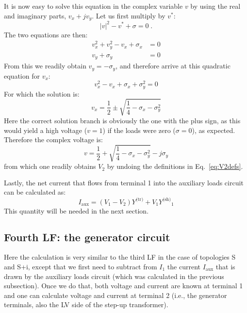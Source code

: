 \documentclass[a4paper,11pt]{article}
\providecommand{\abs}[1]{\lvert#1\rvert}
\newcommand{\Ytr}{\ensuremath{Y^{\textrm{(tr)}}}}
\newcommand{\Ysh}{\ensuremath{Y^{\textrm{(sh)}}}}
\begin{document}
It is now easy to solve this equation in the complex variable $v$ by using the
real and imaginary parts, $v_x + j v_y$. Let us first multiply by $v^*$:
\begin{equation*}
  \abs{v}^2 - v^* + \sigma = 0 \;.
\end{equation*}
The two equations are then:
\begin{align*}
  v_x^2 + v_y^2 - v_x + \sigma_x  & = 0 \\
  v_y + \sigma_y  & = 0
\end{align*}
From this we readily obtain $v_y = -\sigma_y$, and therefore arrive at this
quadratic equation for $v_x$:
\begin{equation*}
  v_x^2 - v_x + \sigma_x  + \sigma_y^2 = 0
\end{equation*}
For which the solution is:
\begin{equation*}
  v_x = \frac{1}{2} \pm \sqrt{\frac{1}{4} - \sigma_x - \sigma_y^2}
\end{equation*}
Here the correct solution branch is obviously the one with the plus sign, as this would
yield a high voltage ($v=1$) if the loads were zero ($\sigma=0$), as expected. Therefore
the complex voltage is:
\begin{equation}
  v = \frac{1}{2} + \sqrt{\frac{1}{4} - \sigma_x - \sigma_y^2} - j \sigma_y
\end{equation}
from which one readily obtains $V_2$ by undoing the definitions in
Eq.~\eqref{eq:V2defs}.

Lastly, the net current that flows from terminal 1 into the auxiliary loads
circuit can be calculated as:
\begin{equation}
  I_{\text{aux}} = (V_1 - V_2) \Ytr + V_1 \Ysh_1
\end{equation}
This quantity will be needed in the next section.



\subsection{Fourth LF: the generator circuit}

Here the calculation is very similar to the third LF in the case of topologies S and
S+i, except that we first need to subtract from $I_1$ the current $I_{\text{aux}}$ that
is drawn by the auxiliary loads circuit (which was calculated in the previous
subsection).  Once we do that, both voltage and current are known at terminal 1 and one
can calculate voltage and current at terminal 2 (i.e., the generator terminals, also the
LV side of the step-up transformer).
\end{document}
